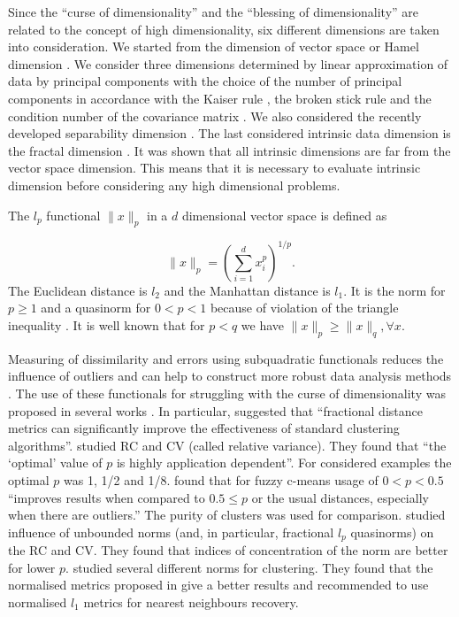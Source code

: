 \documentclass[entropy,article,submit,moreauthors,pdftex]{Definitions/mdpi}
\begin{document}
Since the ``curse of dimensionality'' and the ``blessing of dimensionality'' are related to the concept of high dimensionality, six different dimensions are taken into consideration. We started from the dimension of vector space or Hamel dimension \cite{brown2012introduction}. We consider three dimensions determined by linear approximation of data by principal components \cite{pearson1901, jobson2012applied} with the choice of the number of principal components in accordance with the Kaiser rule \cite{guttman1954some, kaiser1960application}, the broken stick rule \cite{jackson1993stopping} and the condition number of the covariance matrix \cite{gorban2018correction, Fukunaga1971}. We also considered the recently developed separability dimension \cite{gorban2018correction, albergante2019estimating}. The last considered intrinsic data dimension is the fractal dimension \cite{vicsek1992fractal}. It was shown that all intrinsic dimensions are far from the vector space dimension. This means that it is necessary to evaluate intrinsic dimension before considering any high dimensional problems.

The  $l_p$ functional $\|x\|_p$ in a $d$ dimensional vector space is defined as

\begin{equation}
\|x\|_p=\left(\sum_{i=1}^{d}x_i^p\right)^{1/p} \label{eq:Norm}.
\end{equation}
The Euclidean distance is $l_2$ and the Manhattan distance is $l_1$. It is the norm for $p\ge1$ and a quasinorm for $0<p<1$ because of violation of the triangle inequality \cite{kothe1969topological}.
It is well known that for $p<q$ we have $\|x\|_p\ge \|x\|_q, \forall x$.

Measuring of dissimilarity and errors using subquadratic functionals reduces the influence of outliers and can help to construct more robust data analysis methods \cite{franccois2005non, aggarwal2001, francois2007concentration}. The use of these functionals for struggling with the curse of dimensionality was proposed in several works \cite{aggarwal2001, francois2007concentration, dik2014fractional, jayaram2012can, france2012distance, doherty2004non}.
In particular, \cite{aggarwal2001} suggested that “fractional distance metrics can significantly improve the effectiveness of standard clustering algorithms”. \cite{francois2007concentration} studied RC and CV (called relative variance). They found that ``the `optimal' value of $p$ is highly application dependent''. For considered examples the optimal $p$ was 1, 1/2 and 1/8. \cite{dik2014fractional} found that for fuzzy c-means usage of $0<p<0.5$ ``improves results when compared to $0.5\le p$ or the usual distances, especially when there are outliers.'' The purity of clusters was used for comparison. \cite{jayaram2012can} studied influence of unbounded norms (and, in particular, fractional $l_p$ quasinorms) on the RC and CV. They found that indices of concentration of the norm are better for lower $p$. \cite{france2012distance} studied several different norms for clustering. They found that the normalised metrics proposed in \cite{doherty2004non} give a better results and recommended to use normalised $l_1$ metrics for nearest neighbours recovery.
\end{document}

